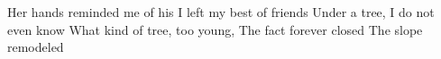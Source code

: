 Her hands reminded me of his
I left my best of friends
Under a tree, I do not even know 
What kind of tree, too young,
The fact forever closed
The slope remodeled